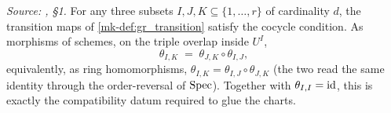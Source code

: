 \begin{lemma}\label{mk-lem:gr_cocycle}
  \leanok

  \textit{Source: \cite{nitsure-hilbert-quot}, \S 1.}
  For any three subsets \(I, J, K \subseteq \{1, \dots, r\}\) of cardinality
  \(d\), the transition maps of \ref{mk-def:gr_transition} satisfy the cocycle
  condition. As morphisms of schemes, on the triple overlap inside \(U^I\),
  \[
    \theta_{I,K} \;=\; \theta_{J,K} \circ \theta_{I,J},
  \]
  equivalently, as ring homomorphisms,
  \(\theta_{I,K} = \theta_{I,J} \circ \theta_{J,K}\) (the two read the same
  identity through the order-reversal of \(\operatorname{Spec}\)). Together with
  \(\theta_{I,I} = \operatorname{id}\), this is exactly the compatibility datum required to
  glue the charts.
\end{lemma}
